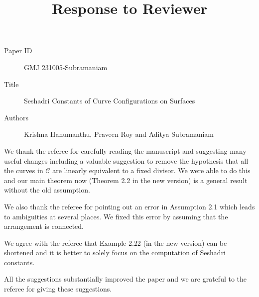 \documentclass[12pt,twoside,reqno]{amsart}
\numberwithin{equation}{section}
\theoremstyle{definition}
\begin{document}
\title{Response to Reviewer}
\begin{description}
\item[Paper ID]  GMJ 231005-Subramaniam

\item [Title] Seshadri Constants of Curve Configurations on Surfaces
\item [Authors] Krishna Hanumanthu, Praveen Roy and Aditya Subramaniam
\end{description}

We thank the referee for carefully reading the manuscript and suggesting 
many useful changes including a valuable suggestion to remove the hypothesis that all the curves in $\mathcal{C}$ are linearly equivalent to a fixed divisor. We were able to do this and our main theorem now (Theorem 2.2 in the new version) is a general result without the old assumption. 

We also thank the referee for pointing out an error in  Assumption 2.1 which leads to 
ambiguities at several places. We fixed this error by assuming that the arrangement is connected. 

We  agree with the referee that Example 2.22 (in the new version)  can be shortened and it is better to solely 
focus on the computation of Seshadri constants. 

All the suggestions substantially improved the paper and we are grateful to the referee for giving these suggestions. 
\end{document}
